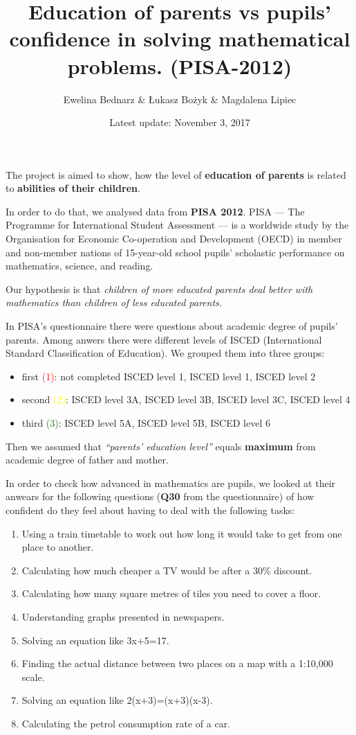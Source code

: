 \documentclass[]{article}
\title{Education of parents vs pupils' confidence in solving mathematical
problems. (PISA-2012)}
\author{Ewelina Bednarz \& Łukasz Bożyk \& Magdalena Lipiec}
\date{Latest update: November 3, 2017}
\begin{document}
\maketitle

\thispagestyle{empty}

The project is aimed to show, how the level of \textbf{education of
parents} is related to \textbf{abilities of their children}.

In order to do that, we analysed data from \textbf{PISA 2012}. PISA ---
The Programme for International Student Assessment --- is a worldwide
study by the Organisation for Economic Co-operation and Development
(OECD) in member and non-member nations of 15-year-old school pupils'
scholastic performance on mathematics, science, and reading.

Our hypothesis is that \emph{children of more educated parents deal
better with mathematics than children of less educated parents.}

In PISA's questionnaire there were questions about academic degree of
pupils' parents. Among anwers there were different levels of ISCED
(International Standard Classification of Education). We grouped them
into three groups:

\begin{itemize}
\item
  first \textcolor{red}{(1)}: not completed ISCED level 1, ISCED level
  1, ISCED level 2
\item
  second \textcolor{yellow}{(2)}: ISCED level 3A, ISCED level 3B, ISCED
  level 3C, ISCED level 4
\item
  third \textcolor{green}{(3)}: ISCED level 5A, ISCED level 5B, ISCED
  level 6
\end{itemize}

Then we assumed that \emph{``parents' education level''} equals
\textbf{maximum} from academic degree of father and mother.

In order to check how advanced in mathematics are pupils, we looked at
their anwears for the following questions (\textbf{Q30} from the
questionnaire) of how confident do they feel about having to deal with
the following tasks:

\begin{enumerate}
\def\labelenumi{\arabic{enumi})}
\item
  Using a train timetable to work out how long it would take to get from
  one place to another.
\item
  Calculating how much cheaper a TV would be after a 30\% discount.
\item
  Calculating how many square metres of tiles you need to cover a floor.
\item
  Understanding graphs presented in newspapers.
\item
  Solving an equation like 3x+5=17.
\item
  Finding the actual distance between two places on a map with a
  1:10,000 scale.
\item
  Solving an equation like 2(x+3)=(x+3)(x-3).
\item
  Calculating the petrol consumption rate of a car.
\end{enumerate}
\end{document}
